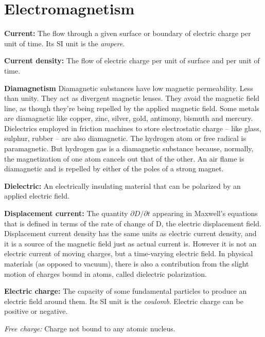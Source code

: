 \section{Electromagnetism}

\begin{list}{}{}
	\item \textbf{Current:} The flow through a given surface or boundary of electric charge per unit of time. Its SI unit is the \emph{ampere}.
	
	\item \textbf{Current density:} The flow of electric charge per unit of surface and per unit of time.
	
	\item \textbf{Diamagnetism}	Diamagnetic substances have low magnetic permeability. Less than unity. They act as divergent magnetic lenses. They avoid the magnetic field line, as though they're being repelled by the applied magnetic field. Some metals are diamagnetic like copper, zinc, silver, gold, antimony, bismuth and mercury. Dielectrics employed in friction machines to
	store electrostatic charge -- like glass, sulphur, rubber -- are also diamagnetic. The hydrogen atom or free radical is paramagnetic. But hydrogen gas is a diamagnetic substance because, normally, the magnetization of one atom cancels out that of the other. An air flame is diamagnetic and is repelled by
	either of the poles of a strong magnet.

	\item \textbf{Dielectric:} An electrically insulating material that can be polarized by an applied electric field.
	
	\item \textbf{Displacement current:} The quantity $\partial D / \partial t$ appearing in Maxwell's equations that is defined in terms of the rate of change of D, the electric displacement field. Displacement current density has the same units as electric current density, and it is a source of the magnetic field just as actual current is. However it is not an electric current of moving charges, but a time-varying electric field. In physical materials (as opposed to vacuum), there is also a contribution from the slight motion of charges bound in atoms, called dielectric polarization. 
	
	\item \textbf{Electric charge:} The capacity of some fundamental particles to produce an electric field around them. Its SI unit is the \emph{coulomb}. Electric charge can be positive or negative.
	\begin{list}{}{}
		\item \emph{Free charge:} Charge not bound to any atomic nucleus.
		

\end{list}
\end{list}
